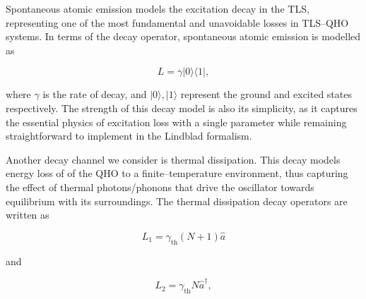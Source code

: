 \documentclass[11pt]{article}
\begin{document}
Spontaneous atomic emission models the excitation decay in the TLS, representing one of the most fundamental and unavoidable losses in TLS--QHO systems. In terms of the decay operator, spontaneous atomic emission is modelled as

\begin{equation} \label{eqn:L_spont}
    L = \gamma|0\rangle\langle1|,
\end{equation}

where $\gamma$ is the rate of decay, and $|0\rangle,|1\rangle$ represent the ground and excited states respectively. The strength of this decay model is also its simplicity, as it captures the essential physics of excitation loss with a single parameter while remaining straightforward to implement in the Lindblad formalism.

Another decay channel we consider is thermal dissipation. This decay models energy loss of of the QHO to a finite--temperature environment, thus capturing the effect of thermal photons/phonons that drive the oscillator towards equilibrium with its surroundings. The thermal dissipation decay operators are written as 

\begin{equation}\label{eqn:L_therm}
    L_1 = \gamma_{\scriptscriptstyle \text{th}}(N+1)\hat{a} 
\end{equation}

and 

\begin{equation*}
    L_2 = \gamma_{\scriptscriptstyle \text{th}}N\hat{a}^\dagger ,
\end{equation*}
\end{document}
